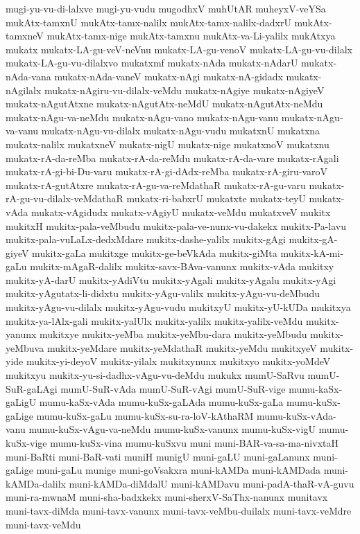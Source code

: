 {mugi-yu-vu-di-lalxve
mugi-yu-vudu
mugodhxV
muhUtAR
muheyxV-veYSa
mukAtx-tamxnU
mukAtx-tamx-nalilx
mukAtx-tamx-nalilx-dadxrU
mukAtx-tamxneV
mukAtx-tamx-nige
mukAtx-tamxnu
mukAtx-va-Li-yalilx
mukAtxya
mukatx
mukatx-LA-gu-veV-neVnu
mukatx-LA-gu-venoV
mukatx-LA-gu-vu-dilalx
mukatx-LA-gu-vu-dilalxvo
mukatxmf
mukatx-nAda
mukatx-nAdarU
mukatx-nAda-vana
mukatx-nAda-vaneV
mukatx-nAgi
mukatx-nA-gidadx
mukatx-nAgilalx
mukatx-nAgiru-vu-dilalx-veMdu
mukatx-nAgiye
mukatx-nAgiyeV
mukatx-nAgutAtxne
mukatx-nAgutAtx-neMdU
mukatx-nAgutAtx-neMdu
mukatx-nAgu-va-neMdu
mukatx-nAgu-vano
mukatx-nAgu-vanu
mukatx-nAgu-va-vanu
mukatx-nAgu-vu-dilalx
mukatx-nAgu-vudu
mukatxnU
mukatxna
mukatx-nalilx
mukatxneV
mukatx-nigU
mukatx-nige
mukatxnoV
mukatxnu
mukatx-rA-da-reMba
mukatx-rA-da-reMdu
mukatx-rA-da-vare
mukatx-rAgali
mukatx-rA-gi-bi-Du-varu
mukatx-rA-gi-dAdx-reMba
mukatx-rA-giru-varoV
mukatx-rA-gutAtxre
mukatx-rA-gu-va-reMdathaR
mukatx-rA-gu-varu
mukatx-rA-gu-vu-dilalx-veMdathaR
mukatx-ri-babxrU
mukatxte
mukatx-teyU
mukatx-vAda
mukatx-vAgidudx
mukatx-vAgiyU
mukatx-veMdu
mukatxveV
mukitx
mukitxH
mukitx-pala-veMbudu
mukitx-pala-ve-nunx-vu-dakekx
mukitx-Pa-lavu
mukitx-pala-vuLaLx-dedxMdare
mukitx-dashe-yalilx
mukitx-gAgi
mukitx-gA-giyeV
mukitx-gaLa
mukitxge
mukitx-ge-beVkAda
mukitx-giMta
mukitx-kA-mi-gaLu
mukitx-mAgaR-dalilx
mukitx-savx-BAva-vanunx
mukitx-vAda
mukitxy
mukitx-yA-darU
mukitx-yAdiVtu
mukitx-yAgali
mukitx-yAgalu
mukitx-yAgi
mukitx-yAgutatx-li-didxtu
mukitx-yAgu-valilx
mukitx-yAgu-vu-deMbudu
mukitx-yAgu-vu-dilalx
mukitx-yAgu-vudu
mukitxyU
mukitx-yU-kUDa
mukitxya
mukitx-ya-lAlx-gali
mukitx-yalUlx
mukitx-yalilx
mukitx-yalilx-veMdu
mukitx-yanunx
mukitxye
mukitx-yeMba
mukitx-yeMbu-dara
mukitx-yeMbudu
mukitx-yeMbuva
mukitx-yeMdare
mukitx-yeMdathaR
mukitx-yeMdu
mukitxyeV
mukitx-yide
mukitx-yi-deyoV
mukitx-yilalx
mukitxynunx
mukitxyo
mukitx-yoMdeV
mukitxyu
mukitx-yu-si-dadhx-vAgu-vu-deMdu
mukukx
mumU-SaRvu
mumU-SuR-gaLAgi
mumU-SuR-vAda
mumU-SuR-vAgi
mumU-SuR-vige
mumu-kaSx-gaLigU
mumu-kaSx-vAda
mumu-kuSx-gaLAda
mumu-kuSx-gaLa
mumu-kuSx-gaLige
mumu-kuSx-gaLu
mumu-kuSx-su-ra-loV-kAthaRM
mumu-kuSx-vAda-vanu
mumu-kuSx-vAgu-va-neMdu
mumu-kuSx-vanunx
mumu-kuSx-vigU
mumu-kuSx-vige
mumu-kuSx-vina
mumu-kuSxvu
muni
muni-BAR-va-sa-ma-nivxtaH
muni-BaRti
muni-BaR-vati
muniH
munigU
muni-gaLU
muni-gaLanunx
muni-gaLige
muni-gaLu
munige
muni-goVsakxra
muni-kAMDa
muni-kAMDada
muni-kAMDa-dalilx
muni-kAMDa-diMdalU
muni-kAMDavu
muni-padA-thaR-vA-guvu
muni-ra-mwnaM
muni-sha-badxkekx
muni-sherxV-SaThx-nanunx
munitavx
muni-tavx-diMda
muni-tavx-vanunx
muni-tavx-veMbu-duilalx
muni-tavx-veMdre
muni-tavx-veMdu
}
